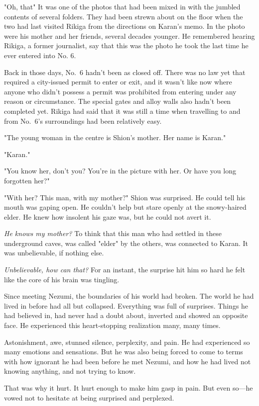 "Oh, that\el " It was one of the photos that had been mixed in with the
jumbled contents of several folders. They had been strewn about on the
floor when the two had last visited Rikiga from the directions on
Karan's memo. In the photo were his mother and her friends, several
decades younger. He remembered hearing Rikiga, a former journalist, say
that this was the photo he took the last time he ever entered into No.
6.

Back in those days, No.~6 hadn't been as closed off. There was no law
yet that required a city-issued permit to enter or exit, and it wasn't
like now where anyone who didn't possess a permit was prohibited from
entering under any reason or circumstance. The special gates and alloy
walls also hadn't been completed yet. Rikiga had said that it was still
a time when travelling to and from No.~6's surroundings had been
relatively easy.

"The young woman in the centre is Shion's mother. Her name is Karan."

"Karan."

"You know her, don't you? You're in the picture with her. Or have you
long forgotten her?"

"With her? This man, with my mother?" Shion was surprised. He could tell
his mouth was gaping open. He couldn't help but stare openly at the
snowy-haired elder. He knew how insolent his gaze was, but he could not
avert it.

\emph{He knows my mother?} To think that this man who had settled in these
underground caves, was called "elder" by the others, was connected to
Karan. It was unbelievable, if nothing else.

\emph{Unbelievable, how can that\el ?} For an instant, the surprise hit him so
hard he felt like the core of his brain was tingling.

Since meeting Nezumi, the boundaries of his world had broken. The world
he had lived in before had all but collapsed. Everything was full of
surprises. Things he had believed in, had never had a doubt about,
inverted and showed an opposite face. He experienced this heart-stopping
realization many, many times.

Astonishment, awe, stunned silence, perplexity, and pain. He had
experienced so many emotions and sensations. But he was also being
forced to come to terms with how ignorant he had been before he met
Nezumi, and how he had lived not knowing anything, and not trying to
know.

That was why it hurt. It hurt enough to make him gasp in pain. But even
so---he vowed not to hesitate at being surprised and perplexed.

